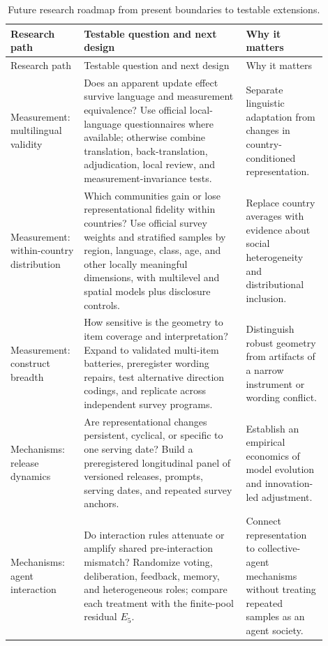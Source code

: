 \small
\begin{longtable}{>{\raggedright\arraybackslash}p{0.18\linewidth}>{\raggedright\arraybackslash}p{0.48\linewidth}>{\raggedright\arraybackslash}p{0.24\linewidth}}
\caption{Future research roadmap from present boundaries to testable extensions.}
\label{tab:future-roadmap}\\
\toprule
\rowcolor{tablehead}
Research path & Testable question and next design & Why it matters \\
\midrule
\endfirsthead
\toprule
\rowcolor{tablehead}
Research path & Testable question and next design & Why it matters \\
\midrule
\endhead
Measurement: multilingual validity & Does an apparent update effect survive language and measurement equivalence? Use official local-language questionnaires where available; otherwise combine translation, back-translation, adjudication, local review, and measurement-invariance tests. & Separate linguistic adaptation from changes in country-conditioned representation. \\
\addlinespace
Measurement: within-country distribution & Which communities gain or lose representational fidelity within countries? Use official survey weights and stratified samples by region, language, class, age, and other locally meaningful dimensions, with multilevel and spatial models plus disclosure controls. & Replace country averages with evidence about social heterogeneity and distributional inclusion. \\
\addlinespace
Measurement: construct breadth & How sensitive is the geometry to item coverage and interpretation? Expand to validated multi-item batteries, preregister wording repairs, test alternative direction codings, and replicate across independent survey programs. & Distinguish robust geometry from artifacts of a narrow instrument or wording conflict. \\
\addlinespace
Mechanisms: release dynamics & Are representational changes persistent, cyclical, or specific to one serving date? Build a preregistered longitudinal panel of versioned releases, prompts, serving dates, and repeated survey anchors. & Establish an empirical economics of model evolution and innovation-led adjustment. \\
\addlinespace
Mechanisms: agent interaction & Do interaction rules attenuate or amplify shared pre-interaction mismatch? Randomize voting, deliberation, feedback, memory, and heterogeneous roles; compare each treatment with the finite-pool residual $E_5$. & Connect representation to collective-agent mechanisms without treating repeated samples as an agent society. \\

\end{longtable}
